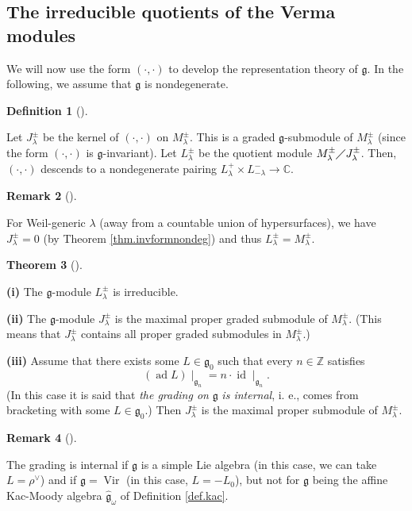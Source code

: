 \documentclass
[numbers=enddot,12pt,final,onecolumn,german,notitlepage]{scrartcl}%
\theoremstyle{definition}
\newtheorem{theo}{Theorem}
\newenvironment{theorem}[1][]
{\begin{theo}[#1]\begin{leftbar}}
{\end{leftbar}\end{theo}}
\newtheorem{defi}[theo]{Definition}
\newenvironment{definition}[1][]
{\begin{defi}[#1]\begin{leftbar}}
{\end{leftbar}\end{defi}}
\newtheorem{remk}[theo]{Remark}
\newenvironment{remark}[1][]
{\begin{remk}[#1]\begin{leftbar}}
{\end{leftbar}\end{remk}}
\begin{document}
\subsection{The irreducible quotients of the Verma modules}

We will now use the form $\left(  \cdot,\cdot\right)  $ to develop the
representation theory of $\mathfrak{g}$. In the following, we assume that
$\mathfrak{g}$ is nondegenerate.

\begin{definition}
Let $J_{\lambda}^{\pm}$ be the kernel of $\left(  \cdot,\cdot\right)  $ on
$M_{\lambda}^{\pm}$. This is a graded $\mathfrak{g}$-submodule of $M_{\lambda
}^{\pm}$ (since the form $\left(  \cdot,\cdot\right)  $ is $\mathfrak{g}%
$-invariant). Let $L_{\lambda}^{\pm}$ be the quotient module $M_{\lambda}%
^{\pm}\diagup J_{\lambda}^{\pm}$. Then, $\left(  \cdot,\cdot\right)  $
descends to a nondegenerate pairing $L_{\lambda}^{+}\times L_{-\lambda}%
^{-}\rightarrow\mathbb{C}$.
\end{definition}

\begin{remark}
For Weil-generic $\lambda$ (away from a countable union of hypersurfaces), we
have $J_{\lambda}^{\pm}=0$ (by Theorem \ref{thm.invformnondeg}) and thus
$L_{\lambda}^{\pm}=M_{\lambda}^{\pm}$.
\end{remark}

\begin{theorem}
\label{thm.verma}\textbf{(i)} The $\mathfrak{g}$-module $L_{\lambda}^{\pm}$ is irreducible.

\textbf{(ii)} The $\mathfrak{g}$-module $J_{\lambda}^{\pm}$ is the maximal
proper graded submodule of $M_{\lambda}^{\pm}$. (This means that $J_{\lambda
}^{\pm}$ contains all proper graded submodules in $M_{\lambda}^{\pm}$.)

\textbf{(iii)} Assume that there exists some $L\in\mathfrak{g}_{0}$ such that
every $n\in\mathbb{Z}$ satisfies
\[
\left(  \operatorname*{ad}L\right)  \mid_{\mathfrak{g}_{n}}=n\cdot
\operatorname*{id}\mid_{\mathfrak{g}_{n}}.
\]
(In this case it is said that \textit{the grading on }$\mathfrak{g}$
\textit{is internal}, i. e., comes from bracketing with some $L\in
\mathfrak{g}_{0}$.) Then $J_{\lambda}^{\pm}$ is the maximal proper submodule
of $M_{\lambda}^{\pm}$.
\end{theorem}

\begin{remark}
The grading is internal if $\mathfrak{g}$ is a simple Lie algebra (in this
case, we can take $L=\rho^{\vee}$) and if $\mathfrak{g}=\operatorname*{Vir}$
(in this case, $L=-L_{0}$), but not for $\mathfrak{g}$ being the affine
Kac-Moody algebra $\widehat{\mathfrak{g}}_{\omega}$ of Definition
\ref{def.kac}.
\end{remark}
\end{document}

